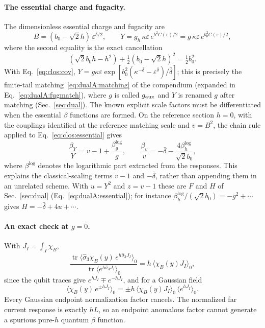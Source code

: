 \documentclass[11pt,a4paper]{article}
\numberwithin{equation}{section}
\newcommand{\db}{\bar\delta}
\begin{document}
\paragraph{The essential charge and fugacity.} The dimensionless essential charge and fugacity are
\begin{equation}
 B=(b_0-\sqrt2h)\,\varepsilon^{\db/2},\qquad
 Y=g_h\,\kappa\varepsilon\,e^{b^2C(\varepsilon)/2}=g\,\kappa\varepsilon\,e^{b_0^2C(\varepsilon)/2},
 \label{eq:clos:essential}
\end{equation}
where the second equality is the exact cancellation
\begin{equation}
 (\sqrt2b_0h-h^2)+\tfrac12(b_0-\sqrt2h)^2=\tfrac12b_0^2 .
 \label{eq:clos:wickcancel}
\end{equation}
With Eq.~\eqref{eq:clos:cov}, $Y=g\kappa\varepsilon\exp[b_0^2(\kappa^{-\db}-\varepsilon^{\db})/\db]$; this is precisely
the finite-tail matching~\eqref{eq:dualA:matching} of the compendium (expanded in Eq.~\eqref{eq:dualA:fugmatch}), where $g$ is called $g_{\rm aux}$ and $Y$ is
renamed $g$ after matching (Sec.~\ref{sec:dual}). The known explicit scale factors must be differentiated when the essential $\beta$ functions are
formed. On the reference section $h=0$, with the couplings identified at the reference matching scale and $v=B^2$,
the chain rule applied to Eq.~\eqref{eq:clos:essential} gives
\begin{equation}
 \frac{\beta_Y}{Y}=v-1+\frac{\beta_g^{\log}}{g},\qquad
 \frac{\beta_v}{v}=-\db-\frac{4\beta_h^{\log}}{\sqrt2b_0},
 \label{eq:clos:classical}
\end{equation}
where $\beta^{\log}$ denotes the logarithmic part extracted from the responses. This explains the classical-scaling terms
$v-1$ and $-\db$, rather than appending them in an unrelated scheme. With $u=Y^2$ and $z=v-1$ these are $F$ and $H$ of
Sec.~\ref{sec:dual} (Eq.~\eqref{eq:dualA:essential}); for instance $\beta_h^{\log}/(\sqrt2b_0)=-g^2+\cdots$ gives
$H=-\db+4u+\cdots$.

\paragraph{An exact check at \texorpdfstring{$g=0$}{g=0}.} With $J_I=\int_I\chi_B$,
\begin{equation}
 \frac{\operatorname{tr}\langle\hat\sigma_3\chi_B(y)\,e^{h\hat\sigma_3J_I}\rangle_0}
 {\operatorname{tr}\langle e^{h\hat\sigma_3J_I}\rangle_0}=h\,\langle\chi_B(y)J_I\rangle_0 ,
\end{equation}
since the qubit traces give $e^{hJ_I}\mp e^{-hJ_I}$, and for a Gaussian field
\begin{equation}
 \langle\chi_B(y)\,e^{\pm hJ_I}\rangle_0=\pm h\,\langle\chi_B(y)J_I\rangle_0\,\langle e^{hJ_I}\rangle_0 .
\end{equation}
Every Gaussian endpoint normalization factor cancels. The normalized far current response is exactly $hL$, so an
endpoint anomalous factor cannot generate a spurious pure-$h$ quantum $\beta$ function.
\end{document}
